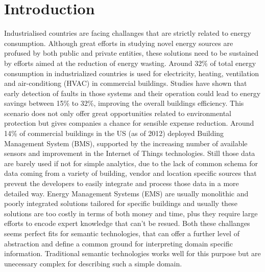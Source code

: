 \chapter*{Introduction}
\label{ch:introduction}
Industrialised countries are facing challanges that are strictly related to energy consumption. Although great efforts in studying novel energy sources are profused by both public and private entities, these solutions need to be sustained by efforts aimed at the reduction of energy wasting. Around 32\% of total energy consumption in industrialized countries is used for electricity, heating, ventilation and air-conditiong (HVAC) in commercial buildings. Studies have shown that early detection of faults in those systems and their operation could lead to energy savings between 15\% to 32\%, improving the overall buildings efficiency. This scenario does not only offer great opportunities related to environmental protection but gives companies a chance for sensible expense reduction. Around 14\% of commercial buildings in the US (as of 2012) deployed Building Management System (BMS), supported by the increasing number of available sensors and improvement in the Internet of Things technologies. Still those data are barely used if not for simple analytics, due to the lack of common schema for data coming from a variety of building, vendor and location specific sources that prevent the developers to easily integrate and process those data in a more detailed way. Energy Management Systems (EMS) are usually monolithic and poorly integrated solutions tailored for specific buildings and usually these solutions are too costly in terms of both money and time, plus they require large efforts to encode expert knowledge that can't be resued. Both these challanges seems perfect fits for semantic technologies, that can offer a further level of abstraction and define a common ground for interpreting domain specific information. Traditional semantic technologies works well for this purpose but are unecessary complex for describing such a simple domain.
